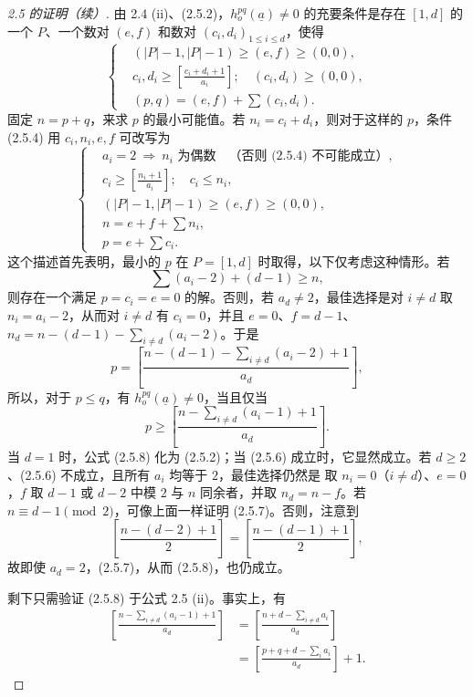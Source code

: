 \begin{proof}[ 2.5 的证明（续）]
由 2.4 (ii)、(2.5.2)，$h_o^{pq}(\underline a)\ne0$ 的充要条件是存在 $[1,d]$ 的一个 $P$、一个数对 $(e,f)$ 和数对 $(c_i,d_i)_{1\leq i\leq d}$，使得
\[
\left\{\begin{aligned}
{}&(|P|-1,|P|-1)\geq(e,f)\geq(0,0),\\
&c_i,d_i\geq\left[\frac{c_i+d_i+1}{a_i}\right];\quad(c_i,d_i)\geq(0,0),\\
&(p,q)=(e,f)+\sum(c_i,d_i).
\end{aligned}\right.\tag{2.5.4}
\]
固定 $n=p+q$，来求 $p$ 的最小可能值。若 $n_i=c_i+d_i$，则对于这样的 $p$，条件 (2.5.4) 用 $c_i,n_i,e,f$ 可改写为
\[
\left\{\begin{aligned}
{}&a_i=2\ \Longrightarrow\ n_i\text{ 为偶数}\quad\text{（否则 (2.5.4) 不可能成立）},\\
&c_i\geq\left[\frac{n_i+1}{a_i}\right];\quad c_i\leq n_i,\\
&(|P|-1,|P|-1)\geq(e,f)\geq(0,0),\\
&n=e+f+\sum n_i,\\
&p=e+\sum c_i.
\end{aligned}\right.\tag{2.5.5}
\]
这个描述首先表明，最小的 $p$ 在 $P=[1,d]$ 时取得，以下仅考虑这种情形。若
\[
 \sum(a_i-2)+(d-1)\geq n,\tag{2.5.6}
\]
则存在一个满足 $p=c_i=e=0$ 的解。否则，若 $a_d\ne2$，最佳选择是对 $i\ne d$ 取 $n_i=a_i-2$，从而对 $i\ne d$ 有 $c_i=0$，并且 $e=0$、$f=d-1$、$n_d=n-(d-1)-\sum_{i\ne d}(a_i-2)$。于是
\[
 p=\left[\frac{n-(d-1)-\sum_{i\ne d}(a_i-2)+1}{a_d}\right],\tag{2.5.7}
\]
所以，对于 $p\leq q$，有 $h_o^{pq}(\underline a)\ne0$，当且仅当
\[
 p\geq\left[\frac{n-\sum_{i\ne d}(a_i-1)+1}{a_d}\right].\tag{2.5.8}
\]
当 $d=1$ 时，公式 (2.5.8) 化为 (2.5.2)；当 (2.5.6) 成立时，它显然成立。若 $d\geq2$、(2.5.6) 不成立，且所有 $a_i$ 均等于 $2$，最佳选择仍然是
取 $n_i=0$（$i\ne d$）、$e=0$，$f$ 取 $d-1$ 或 $d-2$ 中模 $2$ 与 $n$ 同余者，并取 $n_d=n-f$。若 $n\equiv d-1\pmod2$，可像上面一样证明 (2.5.7)。否则，注意到
\[
 \left[\frac{n-(d-2)+1}{2}\right]=\left[\frac{n-(d-1)+1}{2}\right],
\]
故即使 $a_d=2$，(2.5.7)，从而 (2.5.8)，也仍成立。

剩下只需验证 (2.5.8) 于公式 2.5 (ii)。事实上，有
\[
\begin{aligned}
\left[\frac{n-\sum_{i\ne d}(a_i-1)+1}{a_d}\right]
&=\left[\frac{n+d-\sum_{i\ne d}a_i}{a_d}\right]\\
&=\left[\frac{p+q+d-\sum_i a_i}{a_d}\right]+1.
\end{aligned}
\]
\end{proof}

